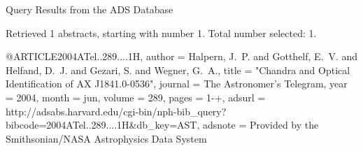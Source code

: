 Query Results from the ADS Database


Retrieved 1 abstracts, starting with number 1.  Total number selected: 1.

@ARTICLE{2004ATel..289....1H,
   author = {{Halpern}, J.~P. and {Gotthelf}, E.~V. and {Helfand}, D.~J. and 
	{Gezari}, S. and {Wegner}, G.~A.},
    title = "{Chandra and Optical Identification of AX J1841.0-0536}",
  journal = {The Astronomer's Telegram},
     year = 2004,
    month = jun,
   volume = 289,
    pages = {1-+},
   adsurl = {http://adsabs.harvard.edu/cgi-bin/nph-bib_query?bibcode=2004ATel..289....1H&db_key=AST},
  adsnote = {Provided by the Smithsonian/NASA Astrophysics Data System}
}


